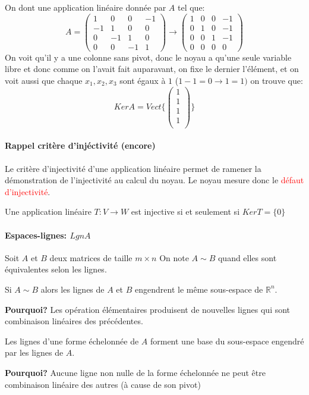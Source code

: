 \begin{exemple}
    On dont une application linéaire donnée par $A$ tel que:
    \[A = \begin{pmatrix}
        1 & 0 & 0 & -1\\
        -1 & 1 & 0 & 0\\
        0 & -1 & 1 & 0 \\
        0 & 0 & -1 & 1
    \end{pmatrix} \to \begin{pmatrix}
         1 & 0 & 0 & -1\\
        0 & 1 & 0 & -1\\
        0 & 0 & 1 & -1 \\
        0 & 0 & 0 & 0
    \end{pmatrix}\]
    On voit qu'il y a une colonne sans pivot, donc le noyau a qu'une seule variable libre et donc comme on l'avait fait auparavant, on fixe le dernier l'élément, et on voit aussi que chaque $x_1, x_2, x_3$ sont égaux à $1$ ($1 -1  = 0 \to 1 = 1)$ on trouve que:
    \[Ker A = Vect\{\begin{pmatrix}
        1 \\ 1 \\1 \\1 \\
    \end{pmatrix}\}\]
    
\end{exemple}

\paragraph{Rappel critère d'injéctivité (encore)}
Le critère d'injectivité d'une application linéaire permet de ramener la démonstration de l'injectivité au calcul du noyau. Le noyau mesure donc le \textcolor{red}{défaut d'injectivité}.
\begin{theoreme}
    Une application linéaire $T: V \to W$ est injective si et seulement si $Ker T = \{0\}$ 
\end{theoreme}
\paragraph{Espaces-lignes: $LgnA$}
Soit $A$ et $B$ deux matrices de taille $m\times n$ On note $A  \sim B$ quand elles sont équivalentes selon les lignes.
\begin{theoreme}
    Si $A \sim B$ alors les lignes de $A$ et $B$ engendrent le même sous-espace de $\mathbb{R}^n$.   
\end{theoreme}
\textbf{Pourquoi?} Les opération élémentaires produisent de nouvelles lignes qui sont combinaison linéaires des précédentes.
\begin{theoreme}
    Les lignes d'une forme échelonnée de $A$ forment une base du sous-espace engendré par les lignes de $A$.
\end{theoreme}
\textbf{Pourquoi?} Aucune ligne non nulle de la forme échelonnée ne peut être combinaison linéaire des autres (à cause de son pivot)

